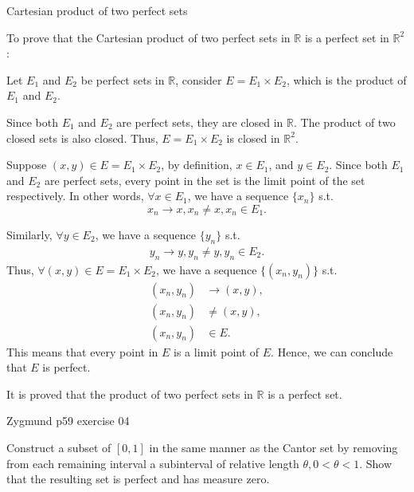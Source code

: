 \documentclass[UTF8,a4paper,10pt]{article}
\begin{document}
\begin{solution}
    \begin{mybox}{Cartesian product of two perfect sets}

      To prove that the Cartesian product of two perfect sets in \(\mathbb{R}\) is a perfect set in \(\mathbb{R} ^2\):

      Let \(E_1\) and \(E_2\) be perfect sets in \(\mathbb{R}\), consider \(E=E_1\times E_2\), which is the product of \(E_1\) and \(E_2\).

      Since both \(E_1\) and \(E_2\) are perfect sets, they are closed in \(\mathbb{R}\). The product of two closed sets is also closed. Thus, \(E=E_1\times E_2\) is closed in \(\mathbb{R}^2\).

      Suppose \((x,y)\in E=E_1\times E_2\), by definition, \(x\in E_1\), and \(y\in E_2\). Since both \(E_1\) and \(E_2\) are perfect sets, every point in the set is the limit point of the set respectively. In other words, \(\forall x \in E_1\), we have a sequence \(\{x_n\}\) s.t. 
      \[x_n\to x,
      x_n\neq x,
      x_n\in E_1.\]

      Similarly, \(\forall y \in E_2\), we have a sequence \(\{y_n\}\) s.t. 
      \begin{equation*}
        \begin{aligned}
          y_n \to y, y_n \neq y, y_n \in E_2.
        \end{aligned}
      \end{equation*}
      Thus, \(\forall (x,y)\in E=E_1\times E_2\), we have a sequence \(\{(x_n, y_n)\}\) s.t. 
      \begin{equation*}
        \begin{aligned}
          (x_n, y_n)&\to (x,y),\\
          (x_n, y_n)&\neq (x,y),\\
          (x_n, y_n)&\in E.
        \end{aligned}
      \end{equation*}
      This means that every point in \(E\) is a limit point of \(E\). Hence, we can conclude that \(E\) is perfect. 
      
      It is proved that the product of two perfect sets in \(\mathbb{R}\) is a perfect set.

    \end{mybox}


 

  \end{solution}
  
  \pagebreak


  \begin{Problem}[]{Zygmund p59 exercise 04}

    Construct a subset of $[0, 1]$ in the same manner as the Cantor set by
    removing from each remaining interval a subinterval of relative length
    $\theta, 0 < \theta < 1$. Show that the resulting set is perfect and has measure zero.
  
  \end{Problem}
\end{document}
